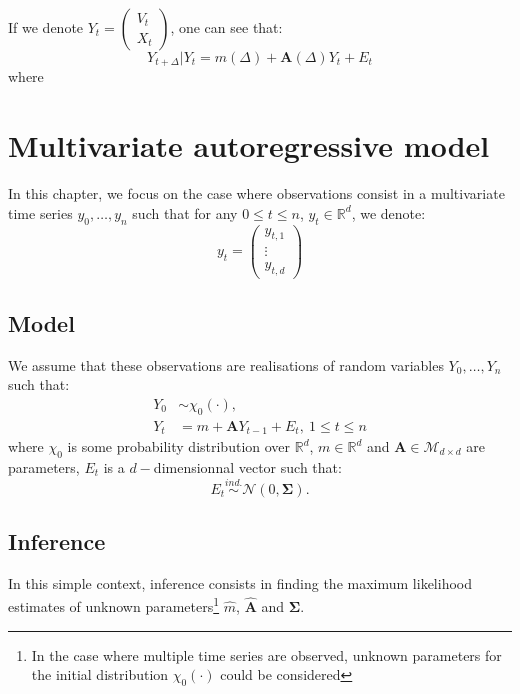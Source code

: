 \documentclass[]{book}
\begin{document}
If we denote \(Y_t = \begin{pmatrix} V_{t} \\ X_{t} \end{pmatrix}\), one can see that:
\begin{equation*}
Y_{t + \Delta}\vert Y_t = m(\Delta) + \mathbf{A}(\Delta)  Y_t + E_t
\end{equation*}
where

\hypertarget{simpleAR}{%
\chapter{Multivariate autoregressive model}\label{simpleAR}}

In this chapter, we focus on the case where observations consist in a multivariate time series \(y_0, \dots, y_n\) such that for any \(0\leq t \leq n\), \(y_t \in \mathbb{R}^d\), we denote:
\[y_t = 
\begin{pmatrix}
y_{t,1}\\
\vdots\\
y_{t, d}
\end{pmatrix}\]

\hypertarget{model}{%
\section{Model}\label{model}}

We assume that these observations are realisations of random variables \(Y_0,\dots, Y_n\) such that:
\begin{align}
Y_0 &\sim \chi_0(\cdot),\nonumber \\
Y_t &= m + \mathbf{A}Y_{t -1} + E_t,~1\leq t \leq n \label{eq:AR-simple}
\end{align}
where \(\chi_0\) is some probability distribution over \(\mathbb{R}^d\), \(m\in\mathbb{R}^d\) and \(\mathbf{A}\in \mathcal{M}_{d\times d}\) are parameters, \(E_t\) is a \(d-\)dimensionnal vector such that:
\begin{equation*}
E_t \overset{ind.}{\sim} \mathcal{N}\left(0, \mathbf{\Sigma}\right).
\end{equation*}

\hypertarget{inference}{%
\section{Inference}\label{inference}}

In this simple context, inference consists in finding the maximum likelihood estimates of unknown parameters\footnote{In the case where multiple time series are observed, unknown parameters for the initial distribution $\chi_0(\cdot)$ could be considered} \(\hat{m}\), \(\hat{\mathbf{A}}\) and \(\mathbf{\Sigma}\).
\end{document}
